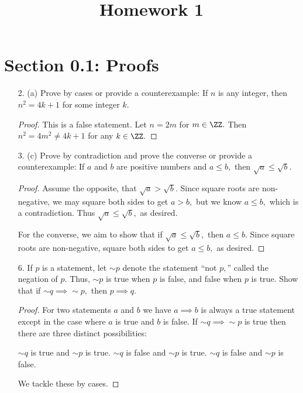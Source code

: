\documentclass{article}
\begin{document}
\title{Homework 1}
\maketitle
\thispagestyle{fancy}

\section*{Section 0.1: Proofs}
\begin{itemize}
	\item[2.] (a) Prove by cases or provide a counterexample: If $n$ is any integer, then $n^2=4k+1$ for some integer $k.$
		\begin{proof}
			This is a false statement. Let $n=2m$ for $m\in\ZZ.$ Then $n^2=4m^2\neq 4k+1$ for any $k\in\ZZ.$

		\end{proof}

	\item[3.]  (c) Prove by contradiction and prove the converse or provide a counterexample: If $a$ and $b$ are positive numbers and $a\le b,$ then $\sqrt{a}\le \sqrt{b}.$
		\begin{proof}
			Assume the opposite, that $\sqrt{a}>\sqrt{b}.$ Since square roots are non-negative, we may square both sides to get $a>b,$ but we know $a\le b,$ which is a contradiction. Thus $\sqrt{a}\le\sqrt{b},$ as desired. 

			For the converse, we aim to show that if $\sqrt{a}\le\sqrt{b},$ then $a\le b.$ Since square roots are non-negative, square both sides to get $a\le b,$ as desired.

		\end{proof}

	\item[6.] If $p$ is a statement, let $\sim p$ denote the statement ``not $p,$'' called the negation of $p.$ Thus, $\sim p$ is true when $p$ is false, and false when $p$ is true. Show that if $\sim q\implies\sim p,$ then $p\implies q.$
		\begin{proof}
			For two statements $a$ and $b$ we have $a\implies b$ is always a true statement except in the case where $a$ is true and $b$ is false. If $\sim q\implies\sim p$ is true then there are three distinct possibilities:
			\begin{enumerate}
				\ii $\sim q$ is true and $\sim p$ is true. 
				\ii $\sim q$ is false and $\sim p$ is true. 
				\ii $\sim q$ is false and $\sim p$ is false.
			\end{enumerate} We tackle these by cases. 


\end{proof}
\end{itemize}
\end{document}

